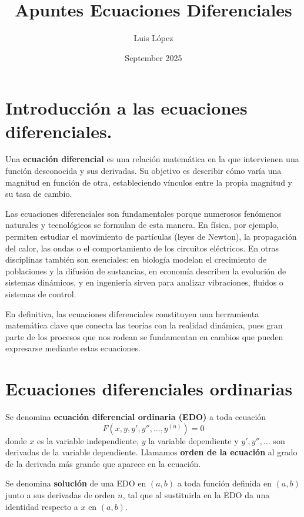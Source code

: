 \documentclass[a4paper,12pt]{article}
\title{Apuntes Ecuaciones Diferenciales}
\author{Luis López}
\date{September 2025}
\begin{document}
\maketitle %

\newpage 

\tableofcontents %
\newpage 
\section*{Introducción a las ecuaciones diferenciales.}
\noindent
Una \textbf{ecuación diferencial} es una relación matemática en la que intervienen una función desconocida y sus derivadas. 
Su objetivo es describir cómo varía una magnitud en función de otra, estableciendo vínculos entre la propia magnitud y su tasa de cambio.  

\medskip
\noindent
Las ecuaciones diferenciales son fundamentales porque numerosos fenómenos naturales y tecnológicos se formulan de esta manera. 
En física, por ejemplo, permiten estudiar el movimiento de partículas (leyes de Newton), la propagación del calor, las ondas o el comportamiento de los circuitos eléctricos. 
En otras disciplinas también son esenciales: en biología modelan el crecimiento de poblaciones y la difusión de sustancias, 
en economía describen la evolución de sistemas dinámicos, 
y en ingeniería sirven para analizar vibraciones, fluidos o sistemas de control.  

\medskip
\noindent
En definitiva, las ecuaciones diferenciales constituyen una herramienta matemática clave que conecta las teorías con la realidad dinámica, 
pues gran parte de los procesos que nos rodean se fundamentan en cambios que pueden expresarse mediante estas ecuaciones.

\clearpage
\section{Ecuaciones diferenciales ordinarias}
\noindent
Se denomina \textbf{ecuación diferencial ordinaria (EDO)} a toda ecuación
\[
F(x,y,y',y'',\ldots,y^{(n)}) = 0
\]
donde $x$ es la variable independiente, $y$ la variable dependiente y $y',y'',\ldots$ son derivadas de la variable dependiente.  
Llamamos \textbf{orden de la ecuación} al grado de la derivada más grande que aparece en la ecuación.  

\medskip
\noindent
Se denomina \textbf{solución} de una EDO en $(a,b)$ a toda función definida en $(a,b)$ junto a sus derivadas de orden $n$, tal que al sustituirla en la EDO da una identidad respecto a $x$ en $(a,b)$.
\end{document}
